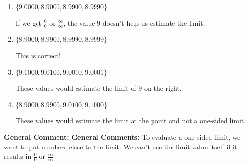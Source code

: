 \documentclass{extbook}[14pt]
\begin{document}
\begin{enumerate}
{\begin{enumerate}[label=\Alph*.]
If we get $\frac{0}{0}$ or $\frac{\infty}{\infty}$, the value 9 doesn't help us estimate the limit.
\item \( \{ 9.0000, 8.9000, 8.9900, 8.9990 \} \)

If we get $\frac{0}{0}$ or $\frac{\infty}{\infty}$, the value 9 doesn't help us estimate the limit.
\item \( \{ 8.9000, 8.9900, 8.9990, 8.9999 \} \)

This is correct!
\item \( \{ 9.1000, 9.0100, 9.0010, 9.0001 \} \)

These values would estimate the limit of 9 on the right.
\item \( \{ 8.9000, 8.9900, 9.0100, 9.1000 \} \)

These values would estimate the limit at the point and not a one-sided limit.
\end{enumerate}

\textbf{General Comment:} \textbf{General Comments:} To evaluate a one-sided limit, we want to put numbers close to the limit. We can't use the limit value itself if it results in $\frac{0}{0}$ or $\frac{\infty}{\infty}$
}
\end{enumerate}
\end{document}

